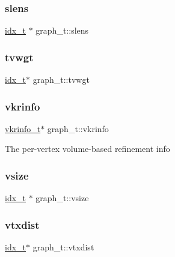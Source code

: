 \mbox{\label{a00734_a743f336965c7805d60a8ed4875cd208d}} 
\subsubsection{\texorpdfstring{slens}{slens}}
{\footnotesize\ttfamily \hyperlink{a00876_aaa5262be3e700770163401acb0150f52}{idx\+\_\+t} $\ast$ graph\+\_\+t\+::slens}

\mbox{\label{a00734_ace9ad621f1e97e5a796c8d24a345aef8}} 
\subsubsection{\texorpdfstring{tvwgt}{tvwgt}}
{\footnotesize\ttfamily \hyperlink{a00876_aaa5262be3e700770163401acb0150f52}{idx\+\_\+t}$\ast$ graph\+\_\+t\+::tvwgt}

\mbox{\label{a00734_a65c5b927198432cf7e6c9314eb10e5c8}} 
\subsubsection{\texorpdfstring{vkrinfo}{vkrinfo}}
{\footnotesize\ttfamily \hyperlink{a00726}{vkrinfo\+\_\+t}$\ast$ graph\+\_\+t\+::vkrinfo}

The per-\/vertex volume-\/based refinement info \mbox{\label{a00734_ad191f54e22012bbc3c7cc5fec228c71a}} 
\subsubsection{\texorpdfstring{vsize}{vsize}}
{\footnotesize\ttfamily \hyperlink{a00876_aaa5262be3e700770163401acb0150f52}{idx\+\_\+t} $\ast$ graph\+\_\+t\+::vsize}

\mbox{\label{a00734_ae2af1f8a1bd524e3368e17d13b7752e1}} 
\subsubsection{\texorpdfstring{vtxdist}{vtxdist}}
{\footnotesize\ttfamily \hyperlink{a00876_aaa5262be3e700770163401acb0150f52}{idx\+\_\+t}$\ast$ graph\+\_\+t\+::vtxdist}


